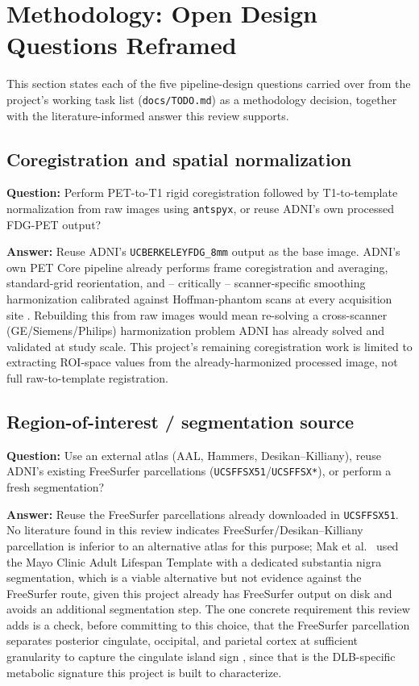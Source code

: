 \section{Methodology: Open Design Questions Reframed}
\label{sec:methodology}

This section states each of the five pipeline-design questions carried over from the project's working task list (\texttt{docs/TODO.md}) as a methodology decision, together with the literature-informed answer this review supports.

\subsection{Coregistration and spatial normalization}
\textbf{Question:} Perform PET-to-T1 rigid coregistration followed by T1-to-template normalization from raw images using \texttt{antspyx}, or reuse ADNI's own processed FDG-PET output?

\textbf{Answer:} Reuse ADNI's \texttt{UCBERKELEYFDG\_8mm} output as the base image. ADNI's own PET Core pipeline already performs frame coregistration and averaging, standard-grid reorientation, and -- critically -- scanner-specific smoothing harmonization calibrated against Hoffman-phantom scans at every acquisition site \cite{jagust2024petcore,jagust2010petcore}. Rebuilding this from raw images would mean re-solving a cross-scanner (GE/Siemens/Philips) harmonization problem ADNI has already solved and validated at study scale. This project's remaining coregistration work is limited to extracting ROI-space values from the already-harmonized processed image, not full raw-to-template registration.

\subsection{Region-of-interest / segmentation source}
\textbf{Question:} Use an external atlas (AAL, Hammers, Desikan--Killiany), reuse ADNI's existing FreeSurfer parcellations (\texttt{UCSFFSX51}/\texttt{UCSFFSX*}), or perform a fresh segmentation?

\textbf{Answer:} Reuse the FreeSurfer parcellations already downloaded in \texttt{UCSFFSX51}. No literature found in this review indicates FreeSurfer/Desikan--Killiany parcellation is inferior to an alternative atlas for this purpose; Mak et al.\ \cite{mak2025alphasynuclein} used the Mayo Clinic Adult Lifespan Template with a dedicated substantia nigra segmentation, which is a viable alternative but not evidence against the FreeSurfer route, given this project already has FreeSurfer output on disk and avoids an additional segmentation step. The one concrete requirement this review adds is a check, before committing to this choice, that the FreeSurfer parcellation separates posterior cingulate, occipital, and parietal cortex at sufficient granularity to capture the cingulate island sign \cite{mckeith2017dlb,lim2009cingulateisland}, since that is the DLB-specific metabolic signature this project is built to characterize.

